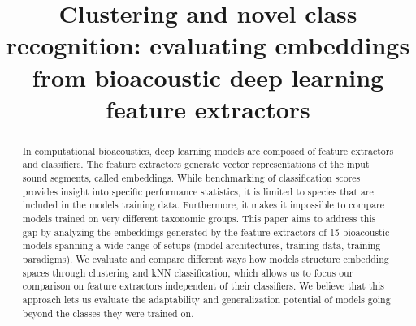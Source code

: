 \documentclass[11pt]{article}
\title{Clustering and novel class recognition: evaluating embeddings from bioacoustic deep learning feature extractors}
\begin{document}
%
\maketitle
\begin{abstract}
In computational bioacoustics, deep learning models are composed of feature extractors and classifiers. 
The feature extractors generate vector representations of the input sound segments, called embeddings. 
While benchmarking of classification scores provides insight into specific performance statistics, it is limited to species that are included in the models training data. Furthermore, it makes it impossible to compare models trained on very different taxonomic groups. 
This paper aims to address this gap by analyzing the embeddings generated by the feature extractors of 15 bioacoustic models spanning a wide range of setups (model architectures, training data, training paradigms). 
We evaluate and compare different ways how models structure embedding spaces through clustering and kNN classification, which allows us to focus our comparison on feature extractors independent of their classifiers. 
We believe that this approach lets us evaluate the adaptability and generalization potential of models going beyond the classes they were trained on.
\end{abstract}
\end{document}
